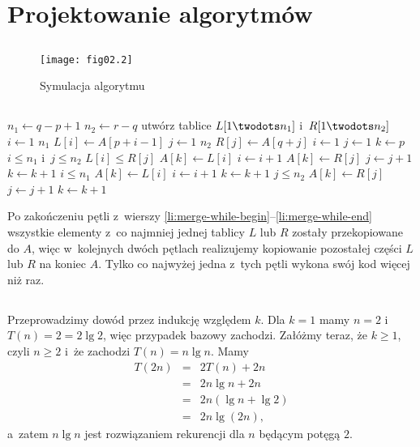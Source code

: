 \section{Projektowanie algorytmów}

\subsection{} %
\begin{figure}[h]
	\begin{center}
		\texttt{[image: fig02.2]}
	\end{center}
	\caption{Symulacja algorytmu }
\end{figure}

\subsection{} %
\begin{codebox}
\li	$n_1\gets q-p+1$
\li	$n_2\gets r-q$
\li	utwórz tablice $L[1\twodots n_1]$ i~$R[1\twodots n_2]$
\li	\For $i\gets 1$ \To $n_1$
\li		\Do
			$L[i]\gets A[p+i-1]$
		\End
\li	\For $j\gets 1$ \To $n_2$
\li		\Do
			$R[j]\gets A[q+j]$
		\End
\li	$i\gets 1$
\li	$j\gets 1$
\li	$k\gets p$
\li	\While $i\le n_1$ i~$j\le n_2$ \label{li:merge-while-begin}
\li		\Do
			\If $L[i]\le R[j]$
\li				\Then
					$A[k]\gets L[i]$
\li					$i\gets i+1$
\li				\Else
					$A[k]\gets R[j]$
\li					$j\gets j+1$
				\End
\li			$k\gets k+1$
		\End \label{li:merge-while-end}
\li	\While $i\le n_1$
\li		\Do
			$A[k]\gets L[i]$
\li			$i\gets i+1$
\li			$k\gets k+1$
		\End
\li	\While $j\le n_2$
\li		\Do
			$A[k]\gets R[j]$
\li			$j\gets j+1$
\li			$k\gets k+1$
		\End
\end{codebox}
Po zakończeniu pętli  z~wierszy \ref{li:merge-while-begin}--\ref{li:merge-while-end} wszystkie elementy z~co najmniej jednej tablicy $L$ lub $R$ zostały przekopiowane do $A$, więc w~kolejnych dwóch pętlach  realizujemy kopiowanie pozostałej części $L$ lub $R$ na koniec $A$. Tylko co najwyżej jedna z~tych pętli wykona swój kod więcej niż raz.

\subsection{} %
Przeprowadzimy dowód przez indukcję względem $k$. Dla $k=1$ mamy $n=2$ i~$T(n)=2=2\lg 2$, więc przypadek bazowy zachodzi. Załóżmy teraz, że $k\ge 1$, czyli $n\ge 2$ i~że zachodzi $T(n)=n\lg n$. Mamy
\begin{eqnarray*}
	T(2n) &=& 2T(n) + 2n \\
	&=& 2n\lg n+2n \\
	&=& 2n(\lg n+\lg 2) \\
	&=& 2n\lg(2n),
\end{eqnarray*}
a~zatem $n\lg n$ jest rozwiązaniem rekurencji dla $n$ będącym potęgą $2$.

